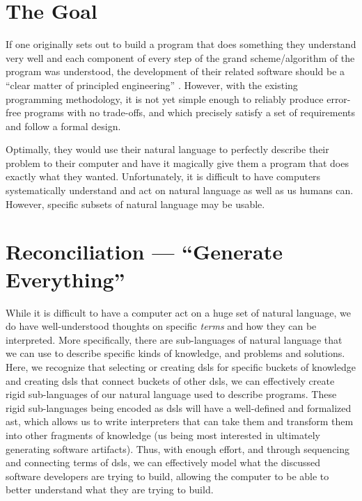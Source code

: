 \section{The Goal}
\label{sec:idlgy:the_goal}

If one originally sets out to build a program that does something they
understand very well and each component of every step of the grand
scheme/algorithm of the program was understood, the development of their related
software should be a ``clear matter of principled engineering'' . However,
with the existing programming methodology, it is not yet simple enough to
reliably produce error-free programs with no trade-offs, and which precisely
satisfy a set of requirements and follow a formal design.

Optimally, they would use their natural language to perfectly describe their
problem to their computer and have it magically give them a program that does
exactly what they wanted. Unfortunately, it is difficult to have computers
systematically understand and act on natural language as well as us humans can.
However, specific subsets of natural language may be usable.

\section{Reconciliation — ``Generate Everything''}
\label{sec:idlgy:generate_everything}

While it is difficult to have a computer act on a huge set of natural language,
we do have well-understood thoughts on specific \textit{terms} and how they can
be interpreted. More specifically, there are sub-languages of natural language
that we can use to describe specific kinds of knowledge, and problems and
solutions. Here, we recognize that selecting or creating \aclp{dsl} for specific
buckets of knowledge and creating \aclp{dsl} that connect buckets of other
\aclp{dsl}, we can effectively create rigid sub-languages of our natural
language used to describe programs. These rigid sub-languages being encoded as
\aclp{dsl} will have a well-defined and formalized \acs{ast}, which allows us to
write interpreters that can take them and transform them into other fragments of
knowledge (us being most interested in ultimately generating software
artifacts). Thus, with enough effort, and through sequencing and connecting
terms of \aclp{dsl}, we can effectively model what the discussed software
developers are trying to build, allowing the computer to be able to better
understand what they are trying to build.

